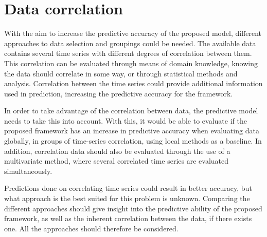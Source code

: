 \section{Data correlation}
\label{section:Architecture:Data}

With the aim to increase the predictive accuracy of the proposed model,
different approaches to data selection and groupings could be needed.
The available data contains several time series with different degrees of correlation between them.
This correlation can be evaluated through means of domain knowledge,
knowing the data should correlate in some way, or through statistical methods and analysis.
Correlation between the time series could provide additional information used in prediction,
increasing the predictive accuracy for the framework.


In order to take advantage of the correlation between data,
the predictive model needs to take this into account.
With this, it would be able to evaluate if the proposed framework has an increase in predictive accuracy
when evaluating data globally, in groups of time-series correlation, using local methods as a baseline.
In addition, correlation data should also be evaluated through the use of a multivariate method,
where several correlated time series are evaluated simultaneously.


Predictions done on correlating time series could result in better accuracy,
but what approach is the best suited for this problem is unknown.
Comparing the different approaches should give insight into the predictive ability of the proposed framework,
as well as the inherent correlation between the data, if there exists one.
All the approaches should therefore be considered.

